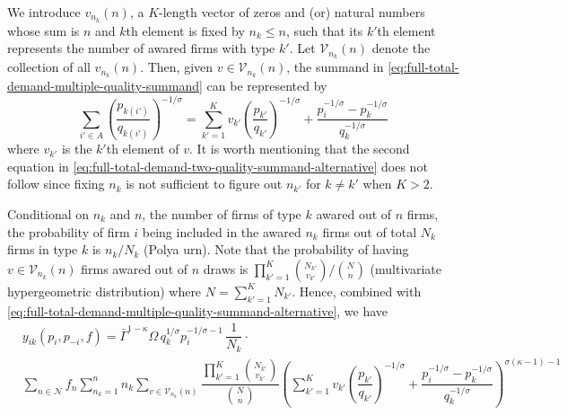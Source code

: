 \documentclass[12pt]{article}
\begin{document}
We introduce $v_{n_k} (n)$, a $K$-length vector of zeros and (or) natural numbers whose sum is $n$ and $k$th element is fixed by $n_k \leq n$, such that its $k'$th element represents the number of awared firms with type $k'$. Let $\mathcal{V}_{n_k} (n)$ denote the collection of all $v_{n_k} (n)$. Then, given $v \in \mathcal{V}_{n_k} (n)$, the summand in \eqref{eq:full-total-demand-multiple-quality-summand} can be represented by
\begin{equation}
\sum_{i'\in A}\left( \frac{p_{k(i')}}{q_{k(i')}}\right)^{-1/\sigma} = 
\sum_{k' =1 }^{K} v_{k'} \left( \dfrac{p_{k'}}{q_{k'}}  \right)^{-1/\sigma} +   
\dfrac{p_i^{-1/\sigma}   - p^{-1/\sigma}_{k} }{{ q_k^{-1/\sigma }}}
\label{eq:full-total-demand-multiple-quality-summand-alternative}
\end{equation}
where $v_{k'}$ is the $k'$th element of $v$. It is worth mentioning that the second equation in \eqref{eq:full-total-demand-two-quality-summand-alternative} does not follow since fixing $n_k$ is not sufficient to figure out $n_{k'}$ for $k \neq k'$ when $K > 2$.

Conditional on $n_k$ and $n$, the number of firms of type $k$ awared out of $n$ firms, the probability of firm $i$ being included in the awared $n_k$ firms out of total $N_k$ firms in type $k$ is $n_k / N_k$ (Polya urn). Note that the probability of having $v \in \mathcal{V}_{n_k}(n)$ firms awared out of $n$ draws is $\prod_{k'=1}^K \binom{ N_{k'} }{ v_{k'} } / \binom{N}{n}$ (multivariate hypergeometric distribution) where $N = \sum_{k'=1}^K N_{k'}$. Hence, combined with \eqref{eq:full-total-demand-multiple-quality-summand-alternative}, we have
\begin{align}
& y_{ik}(p_i, p_{-i}, f) 
=  \bar{\Gamma}^{1-\kappa}\Omega \, q_k^{1/\sigma}p_i^{-1/\sigma - 1}\, \dfrac{1}{N_k} \cdot \\ 
&\sum_{n \in \mathcal{N} } f_n   \sum_{n_k =1}^n  
n_k \sum_{v \in \mathcal{V}_{n_k} (n)} 
\dfrac{\prod_{k'=1}^K \binom{ N_{k'} }{ v_{k'} } }{\binom{N}{n}}
\left( 
\sum_{k' =1 }^{K} v_{k'} \left( \dfrac{p_{k'}}{q_{k'}}  \right)^{-1/\sigma} +   
\dfrac{p_i^{-1/\sigma}   - p^{-1/\sigma}_{k} }{{ q_k^{-1/\sigma }}}
\right)^{\sigma (\kappa - 1)-1}
\end{align}
\end{document}
